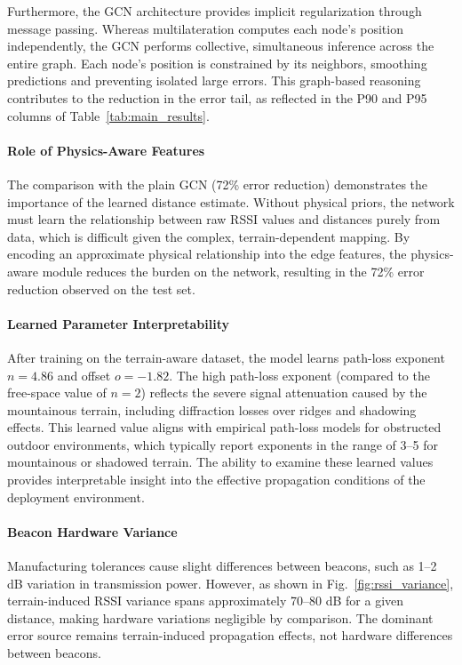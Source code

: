 \documentclass{ieeeaccess}
\begin{document}
Furthermore, the GCN architecture provides implicit regularization through message passing. Whereas multilateration computes each node's position independently, the GCN performs collective, simultaneous inference across the entire graph. Each node's position is constrained by its neighbors, smoothing predictions and preventing isolated large errors. This graph-based reasoning contributes to the reduction in the error tail, as reflected in the P90 and P95 columns of Table~\ref{tab:main_results}.

\paragraph{Role of Physics-Aware Features}
The comparison with the plain GCN (72\% error reduction) demonstrates the importance of the learned distance estimate. Without physical priors, the network must learn the relationship between raw RSSI values and distances purely from data, which is difficult given the complex, terrain-dependent mapping. By encoding an approximate physical relationship into the edge features, the physics-aware module reduces the burden on the network, resulting in the 72\% error reduction observed on the test set.

\paragraph{Learned Parameter Interpretability}
After training on the terrain-aware dataset, the model learns path-loss exponent $n = 4.86$ and offset $o = -1.82$. The high path-loss exponent (compared to the free-space value of $n = 2$) reflects the severe signal attenuation caused by the mountainous terrain, including diffraction losses over ridges and shadowing effects. This learned value aligns with empirical path-loss models for obstructed outdoor environments, which typically report exponents in the range of 3--5 for mountainous or shadowed terrain. The ability to examine these learned values provides interpretable insight into the effective propagation conditions of the deployment environment.

\paragraph{Beacon Hardware Variance}
Manufacturing tolerances cause slight differences between beacons, such as 1--2 dB variation in transmission power. However, as shown in Fig.~\ref{fig:rssi_variance}, terrain-induced RSSI variance spans approximately 70--80 dB for a given distance, making hardware variations negligible by comparison. The dominant error source remains terrain-induced propagation effects, not hardware differences between beacons.
\end{document}
